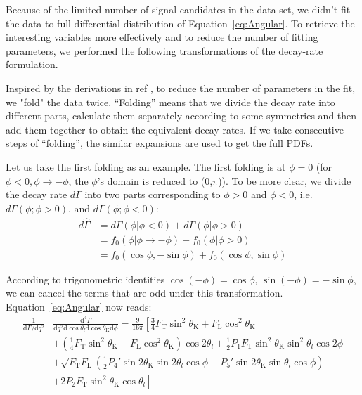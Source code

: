 Because of the limited number of signal candidates in the data set, we didn't fit the data to full differential distribution of Equation~\ref{eq:Angular}.
To retrieve the interesting variables more effectively and to reduce the number of fitting parameters, we performed the following transformations of the decay-rate formulation.

Inspired by the derivations in ref \cite{LHCb2}\cite{Matias2012}, to reduce the number of parameters in the fit, we "fold" the data twice.
``Folding'' means that we divide the decay rate into different parts, calculate them separately according to some symmetries and then add them together to obtain the equivalent decay rates.
If we take consecutive steps of ``folding'', the similar expansions are used to get the full PDFs.

Let us take the first folding as an example.
The first folding is at $ \phi=0$ (for $\phi<0,\phi\rightarrow-\phi$, the $\phi$'s domain is reduced to (0,$\pi$)).
To be more clear, we divide the decay rate $d\Gamma$ into two parts corresponding to $\phi>0$ and $\phi<0$, i.e. $d\Gamma(\phi;\phi>0)$, and $d\Gamma(\phi;\phi<0)$:
\begin{equation} \label{eq:folding}
  \begin{split}
    d\hat{\Gamma} &= d\Gamma(\phi|\phi<0) + d\Gamma(\phi|\phi>0) \\
    & = f_0(\phi|\phi\rightarrow-\phi) + f_0(\phi|\phi>0) \\
    & = f_0(\cos\phi, -\sin\phi) + f_0(\cos\phi, \sin\phi)
  \end{split}
\end{equation}

According to trigonometric identities $\cos(-\phi) = \cos\phi $, $\sin(-\phi) = -\sin\phi $, we can cancel the terms that are odd under this transformation.
Equation~\ref{eq:Angular} now reads:
\begin{equation} \label{eq:fold1}
  \begin{split}
    \frac{1}{\mathrm{d}\Gamma/\mathrm{d}q^2}&\frac{\mathrm{d}^4\Gamma}{\mathrm{d}q^2 \mathrm{d}\cos\theta_l \mathrm{d}\cos\theta_\mathrm{K} \mathrm{d}\phi} = \frac{9}{16\pi}\left[\frac{3}{4}F_\mathrm{T}\sin^2\theta_\mathrm{K} + F_\mathrm{L}\cos^2\theta_\mathrm{K} \right.\\
      &\left.+(\frac{1}{4}F_\mathrm{T}\sin^2\theta_\mathrm{K}-F_\mathrm{L}\cos^2\theta_\mathrm{K})\cos2\theta_l+\frac{1}{2}P_1F_\mathrm{T}\sin^2\theta_\mathrm{K}\sin^2\theta_l\cos 2\phi \right.\\
      &+\sqrt{F_\mathrm{T}F_\mathrm{L}}(\frac{1}{2}P_4'\sin2\theta_\mathrm{K}\sin2\theta_l\cos\phi+P_5'\sin2\theta_\mathrm{K}\sin\theta_l\cos\phi )\\
      &\left.+2P_2F_\mathrm{T}\sin^2\theta_\mathrm{K}\cos\theta_l \right]
  \end{split}
\end{equation}

